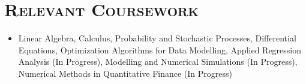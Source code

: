 \documentclass{article}
\makeatletter
\newcommand{\headerrow}[2]
{\begin{tabular*}{\linewidth}{l@{\extracolsep{\fill}}r}
    #1 &
    #2 \\
\end{tabular*}}
\makeatother
\begin{document}
\begin{itemize}[leftmargin=0em]
%

%

\end{itemize}

\section*{\textsc{\textbf{Relevant Coursework}}}
\begin{itemize}[itemsep=0em, leftmargin=0.7em]
\item[]
    Linear Algebra,
    Calculus,
    Probability and Stochastic Processes,
    Differential Equations,
    Optimization Algorithms for Data Modelling,
    Applied Regression Analysis (In Progress),
    Modelling and Numerical Simulations (In Progress),
    Numerical Methods in Quantitative Finance (In Progress)
\end{itemize}
\end{document}
